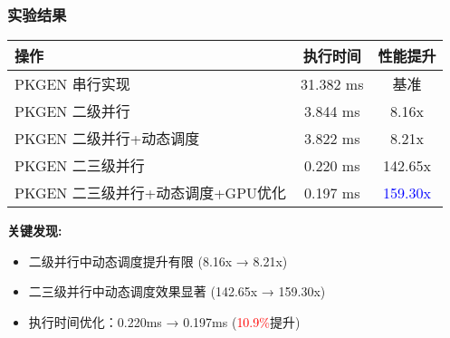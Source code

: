 \documentclass[slide]{../../custom}
\begin{document}
\begin{frame}
  \frametitle{实验结果}
  \centering
  \begin{tabular}{|l|c|c|}
    \hline
    \textbf{操作} & \textbf{执行时间} & \textbf{性能提升} \\
    \hline
    PKGEN 串行实现 \cite{Wang2025} & 31.382 ms & 基准 \\
    \hline
    PKGEN 二级并行 \cite{Wang2025} & 3.844 ms & 8.16x \\
    \hline
    PKGEN 二级并行+动态调度 & 3.822 ms & 8.21x \\
    \hline
    PKGEN 二三级并行 \cite{Wang2025} & 0.220 ms & 142.65x \\
    \hline
    PKGEN 二三级并行+动态调度+GPU优化 & 0.197 ms & \textcolor{blue}{159.30x} \\
    \hline
  \end{tabular}

  \vspace{0.5cm}
  \textbf{关键发现:}
  \begin{itemize}
    \item 二级并行中动态调度提升有限 (8.16x → 8.21x)
    \item 二三级并行中动态调度效果显著 (142.65x → 159.30x)
    \item 执行时间优化：0.220ms → 0.197ms (\textcolor{red}{10.9\%}提升)
  \end{itemize}
\end{frame}
\end{document}
